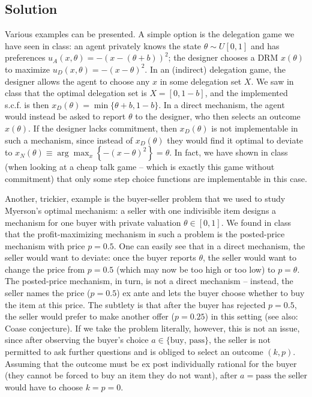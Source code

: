 \documentclass[a4paper]{article}
\begin{document}
\subsection*{Solution}
Various examples can be presented. 
A simple option is the delegation game we have seen in class: an agent privately knows the state $\theta \sim U[0,1]$ and has preferences $u_A(x,\theta) = -(x-(\theta+b))^2$; the designer chooses a DRM $x(\theta)$ to maximize $u_D(x,\theta) = -(x-\theta)^2$. In an (indirect) delegation game, the designer allows the agent to choose any $x$ in some delegation set $X$. We saw in class that the optimal delegation set is $X=[0,1-b]$, and the implemented s.c.f. is then $x_D(\theta) = \min \{\theta+b, 1-b\}$. In a direct mechanism, the agent would instead be asked to report $\theta$ to the designer, who then selects an outcome $x(\theta)$. If the designer lacks commitment, then $x_D(\theta)$ is not implementable in such a mechanism, since instead of $x_D(\theta)$ they would find it optimal to deviate to $x_N(\theta) \equiv \arg \max_x \left\{ -(x-\theta)^2 \right\} = \theta$. In fact, we have shown in class (when looking at a cheap talk game -- which is exactly this game without commitment) that only some step choice functions are implementable in this case.

Another, trickier, example is the buyer-seller problem that we used to study Myerson's optimal mechanism: a seller with one indivisible item designs a mechanism for one buyer with private valuation $\theta \in [0,1]$. We found in class that the profit-maximizing mechanism in such a problem is the posted-price mechanism with price $p=0.5$. 
One can easily see that in a direct mechanism, the seller would want to deviate: once the buyer reports $\theta$, the seller would want to change the price from $p=0.5$ (which may now be too high or too low) to $p=\theta$. The posted-price mechanism, in turn, is not a direct mechanism -- instead, the seller names the price ($p=0.5$) ex ante and lets the buyer choose whether to buy the item at this price. 
The subtlety is that after the buyer has rejected $p=0.5$, the seller would prefer to make another offer ($p=0.25$) in this setting (see also: Coase conjecture). If we take the problem literally, however, this is not an issue, since after observing the buyer's choice $a \in \{\text{buy, pass}\}$, the seller is not permitted to ask further questions and is obliged to select an outcome $(k,p)$. Assuming that the outcome must be ex post individually rational for the buyer (they cannot be forced to buy an item they do not want), after $a=\text{pass}$ the seller would have to choose $k=p=0$.
\fi
\end{document}
